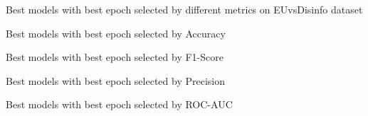 \begin{table}[!htbp]
    \caption{Best models with best epoch selected by different metrics on EUvsDisinfo dataset}
    \label{tab:euvsdisinfo_best_models}
    \centering

    \begin{subtable}[t]{\linewidth}
        \footnotesize
        \caption{Best models with best epoch selected by Accuracy}
        
    \end{subtable}

    \vspace{1em}

    \begin{subtable}[t]{\linewidth}
        \footnotesize
        \caption{Best models with best epoch selected by F1-Score}
        
    \end{subtable}

    \vspace{1em}

    \begin{subtable}[t]{\linewidth}
        \footnotesize
        \caption{Best models with best epoch selected by Precision}
        
    \end{subtable}


    \vspace{1em}

    \begin{subtable}[t]{\linewidth}
        \footnotesize
        \caption{Best models with best epoch selected by ROC-AUC}
        
    \end{subtable}



\end{table}